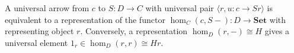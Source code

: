 A universal arrow from $c$ to $S: D \to C$ with universal pair $\langle r, u: c \to Sr \rangle$ is equivalent to a representation of the functor $\hom_C(c, S-): D \to \mathbf{Set}$ with representing object $r$. Conversely, a representation $\hom_D(r, -) \cong H$ gives a universal element $1_r \in \hom_D(r, r) \cong Hr$.
